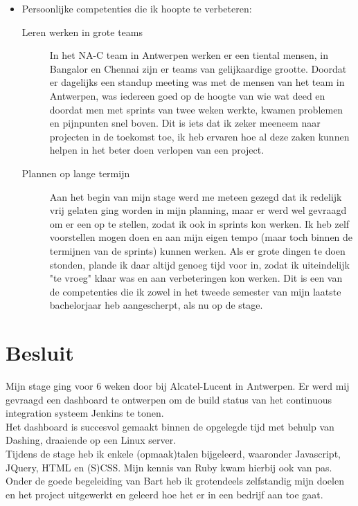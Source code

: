 \documentclass[10pt,a4paper]{article}
\begin{document}
\begin{itemize}
\begin{description}
\end{description}
\item Persoonlijke competenties die ik hoopte te verbeteren:
\begin{description}
\item[Leren werken in grote teams] In het NA-C team in Antwerpen werken er een tiental mensen, in Bangalor en Chennai zijn er teams van gelijkaardige grootte. Doordat er dagelijks een standup meeting was met de mensen van het team in Antwerpen, was iedereen goed op de hoogte van wie wat deed en doordat men met sprints van twee weken werkte, kwamen problemen en pijnpunten snel boven. Dit is iets dat ik zeker meeneem naar projecten in de toekomst toe, ik heb ervaren hoe al deze zaken kunnen helpen in het beter doen verlopen van een project.
\item[Plannen op lange termijn] Aan het begin van mijn stage werd me meteen gezegd dat ik redelijk vrij gelaten ging worden in mijn planning, maar er werd wel gevraagd om er een op te stellen, zodat ik ook in sprints kon werken. Ik heb zelf voorstellen mogen doen en aan mijn eigen tempo (maar toch binnen de termijnen van de sprints) kunnen werken. Als er grote dingen te doen stonden, plande ik daar altijd genoeg tijd voor in, zodat ik uiteindelijk "te vroeg" klaar was en aan verbeteringen kon werken. Dit is een van de competenties die ik zowel in het tweede semester van mijn laatste bachelorjaar heb aangescherpt, als nu op de stage.  
\end{description}
\end{itemize}

\section{Besluit}
\label{besluit}
Mijn stage ging voor 6 weken door bij Alcatel-Lucent in Antwerpen. Er werd mij gevraagd een dashboard te ontwerpen om de build status van het continuous integration systeem Jenkins te tonen.\\
Het dashboard is succesvol gemaakt binnen de opgelegde tijd met behulp van Dashing, draaiende op een Linux server.\\
Tijdens de stage heb ik enkele (opmaak)talen bijgeleerd, waaronder Javascript, JQuery, HTML en (S)CSS. Mijn kennis van Ruby kwam hierbij ook van pas.\\
Onder de goede begeleiding van Bart heb ik grotendeels zelfstandig mijn doelen en het project uitgewerkt en geleerd hoe het er in een bedrijf aan toe gaat.
\end{document}
